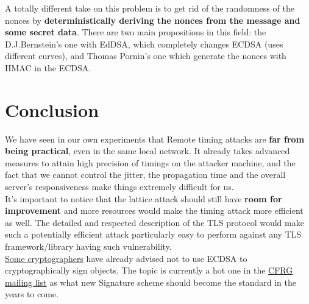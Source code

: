 \documentclass[a4paper,11pt]{article}
\begin{document}
A totally different take on this problem is to get rid of the randomness of the nonces by \textbf{deterministically deriving the nonces from the message and some secret data}. There are two main propositions in this field: the D.J.Bernstein's one with EdDSA\cite{eddsa}, which completely changes ECDSA (uses different curves), and Thomas Pornin's\cite{pornin} one which generate the nonces with HMAC in the ECDSA.

\section{Conclusion}

We have seen in our own experiments that Remote timing attacks are \textbf{far from being practical}, even in the same local network. It already takes advanced measures to attain high precision of timings on the attacker machine, and the fact that we cannot control the jitter, the propagation time and the overall server's responsiveness make things extremely difficult for us.\\

It's important to notice that the lattice attack should still have \textbf{room for improvement} and more resources would make the timing attack more efficient as well. The detailed and respected description of the TLS protocol would make such a potentially efficient attack particularly easy to perform against any TLS framework/library having such vulnerability.\\ \href{http://blog.cryptographyengineering.com/2012/03/surviving-bad-rng.html}{Some cryptographers} have already advised not to use ECDSA to cryptographically sign objects. The topic is currently a hot one in the \href{http://www.ietf.org/mail-archive/web/cfrg/current/maillist.html}{CFRG mailing list} as what new Signature scheme should become the standard in the years to come.

\newpage
\end{document}
